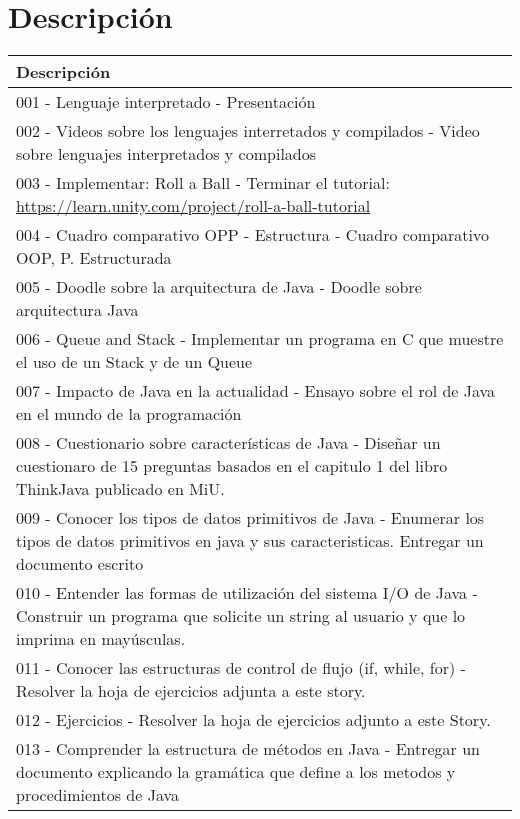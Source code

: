 \section{Descripción}
\begin{center}
   \begin{longtable}{ | p{18cm} | }
       \hline
        Descripción  \\
       \hline
        001 - Lenguaje interpretado - Presentación \\
        \hline
        002 - Videos sobre los lenguajes interretados y compilados -  Video sobre lenguajes interpretados y compilados \\
        \hline
        003 - Implementar: Roll a Ball - Terminar el tutorial: \url{https://learn.unity.com/project/roll-a-ball-tutorial} \\
        \hline
        004 - Cuadro comparativo OPP - Estructura - Cuadro comparativo OOP, P. Estructurada \\
        \hline
        005 - Doodle sobre la arquitectura de Java - Doodle sobre arquitectura Java \\
        \hline
        006 - Queue and Stack - Implementar un programa en C que muestre el uso de un Stack y de un Queue \\
        \hline
        007 - Impacto de Java en la actualidad - Ensayo sobre el rol de Java en el mundo de la programación  \\
        \hline
        008 - Cuestionario sobre características de Java - Diseñar un cuestionaro de 15 preguntas basados en el capitulo 1 del libro ThinkJava publicado en MiU. \\
        \hline
        009 - Conocer los tipos de datos primitivos de Java - 
        Enumerar los tipos de datos primitivos en java y sus caracteristicas. Entregar un documento escrito \\
        \hline
        010 - Entender las formas de utilización del sistema I/O de Java - Construir un programa que solicite un string al usuario y que lo imprima en mayúsculas. \\
        \hline
        011 - Conocer las estructuras de control de flujo (if, while, for) - Resolver la hoja de ejercicios adjunta a este story. \\
        \hline
        012 - Ejercicios - Resolver la hoja de ejercicios adjunto a este Story. \\
        \hline
        013 - Comprender la estructura de métodos en Java - Entregar un documento explicando la gramática que define a los metodos y procedimientos de Java \\

\end{longtable}
\end{center}
